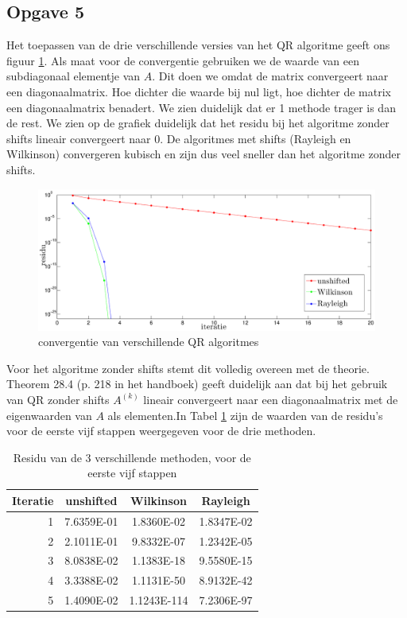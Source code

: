 \documentclass[a4paper, 12pt, titlepage]{report}
\begin{document}
\subsection{Opgave 5}
Het toepassen van de drie verschillende versies van het QR algoritme geeft ons figuur \ref{3QRs}. Als maat voor de convergentie gebruiken we de waarde van een subdiagonaal elementje van $A$. Dit doen we omdat de matrix convergeert naar een diagonaalmatrix. Hoe dichter die waarde bij nul ligt, hoe dichter de matrix een diagonaalmatrix benadert. We zien duidelijk dat er 1 methode trager is dan de rest. We zien op de grafiek duidelijk dat het residu bij het algoritme zonder shifts lineair convergeert naar 0. De algoritmes met shifts (Rayleigh en Wilkinson) convergeren kubisch en zijn dus veel sneller dan het algoritme zonder shifts.

\begin{figure}[htb]
	\centering
	\includegraphics[width=\textwidth]{3QRS.eps}
	\caption{convergentie van verschillende QR algoritmes}
	\label{3QRs}
\end{figure}


Voor het algoritme zonder shifts stemt dit volledig overeen met de theorie. Theorem 28.4 (p. 218 in het handboek) geeft duidelijk aan dat bij het gebruik van QR zonder shifts $A^{(k)}$ lineair convergeert naar een diagonaalmatrix met de eigenwaarden van $A$ als elementen.In Tabel \ref{errorQR} zijn de waarden van de residu's voor de eerste vijf stappen weergegeven voor de drie methoden.\\

\begin{table}[h]
\begin{center}
\begin{tabular}{r||c|c|c}

Iteratie	&	\textbf{unshifted}	&	\textbf{Wilkinson}	&	\textbf{Rayleigh}	\\
\hline
1	&	7.6359E-01	&	1.8360E-02	&	1.8347E-02	\\
2	&	2.1011E-01	&	9.8332E-07	&	1.2342E-05	\\
3	&	8.0838E-02	&	1.1383E-18	&	9.5580E-15	\\
4	&	3.3388E-02	&	1.1131E-50	&	8.9132E-42	\\
5	&	1.4090E-02	&	1.1243E-114	&	7.2306E-97	\\

\end{tabular}
\caption{Residu van de 3 verschillende methoden, voor de eerste vijf stappen}
\label{errorQR}

\end{center}
\end{table}
\end{document}
